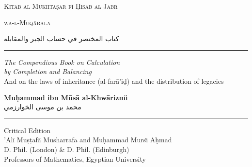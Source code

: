 \documentclass[11pt,a4paper,openany,oneside]{book}
\newcommand{\ar}[1]{{\arabicfont\beginR #1\endR}}
\begin{document}
\begin{titlepage}
\begin{center}

\vspace*{1.5cm}

{\fontsize{32}{38}\selectfont\textcolor{titlecolor}{\textsc{Kit\=ab al-Mukhta\d{s}ar f\"{\i} \d{H}is\=ab al-Jabr}}}

\vspace{0.3cm}

{\fontsize{32}{38}\selectfont\textcolor{titlecolor}{\textsc{wa-l-Muq\=abala}}}

\vspace{0.8cm}

\begin{arabicbox}[width=0.85\textwidth,boxrule=0pt,colback=arabicbg]
\begin{center}
\Large
كتاب المختصر في حساب الجبر والمقابلة
\end{center}
\end{arabicbox}

\vspace{1cm}

\rule{0.5\textwidth}{1pt}

\vspace{1cm}

{\Large\textit{The Compendious Book on Calculation}}\\[0.2cm]
{\Large\textit{by Completion and Balancing}}\\[0.5cm]
{\normalsize And on the laws of inheritance (al-far\=a'i\d{d}) and the distribution of legacies}

\vspace{1.2cm}

{\LARGE\textbf{Mu\d{h}ammad ibn M\=us\=a al-Khw\=arizm\"{\i}}}\\[0.3cm]
{\Large\ar{محمد بن موسى الخوارزمي}}

\vspace{1cm}

\rule{0.3\textwidth}{0.5pt}

\vspace{0.8cm}

{\large Critical Edition}\\[0.2cm]
{\large 'Al\=i Mu\d{s}\d{t}af\=a Musharrafa and Mu\d{h}ammad Murs\"{\i} A\d{h}mad}\\[0.2cm]
{\normalsize D. Phil. (London) \& D. Phil. (Edinburgh)}\\[0.2cm]
{\normalsize Professors of Mathematics, Egyptian University}


\end{center}
\end{titlepage}
\end{document}
